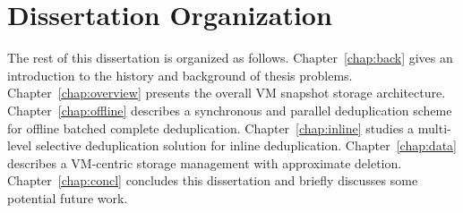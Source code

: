 \section{Dissertation Organization}
\label{intro:organ}
The rest of this dissertation is organized as follows.  
Chapter~\ref{chap:back} gives an introduction to the history and background of thesis problems.
Chapter~\ref{chap:overview} presents the overall VM snapshot storage architecture.
Chapter~\ref{chap:offline}  describes a synchronous and parallel deduplication scheme for offline batched complete deduplication.
Chapter~\ref{chap:inline} studies a multi-level selective deduplication solution for inline deduplication.
Chapter~\ref{chap:data}  describes a VM-centric storage management with approximate deletion.
Chapter~\ref{chap:concl}  concludes this  dissertation  and  briefly discusses some potential future work.

